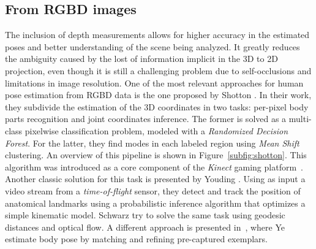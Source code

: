  \subsection{From RGBD images}\label{subsec:from_rgbd_images}
The inclusion of depth measurements allows for higher accuracy in the estimated poses and better understanding of the scene being analyzed. It greatly reduces the ambiguity caused by the lost of information implicit in the 3D to 2D projection, even though it is still a challenging problem due to self-occlusions and limitations in image resolution. One of the most relevant approaches for human pose estimation from RGBD data is the one proposed by Shotton \etal\cite{shotton2011real}. In their work, they subdivide the estimation of the 3D coordinates in two tasks: per-pixel body parts recognition and joint coordinates inference. The former is solved as a multi-class pixelwise classification problem, modeled with a \emph{Randomized Decision Forest}. For the latter, they find modes in each labeled region using \emph{Mean Shift} clustering. An overview of this pipeline is shown in Figure~\ref{subfig:shotton}. This algorithm was introduced as a core component of the \emph{Kinect} gaming platform~\cite{han2013enhanced}. Another classic solution for this task is presented by Youding \etal\cite{Youding_Zhu2008-pr}. Using as input a video stream from a \emph{time-of-flight} sensor, they detect and track the position of anatomical landmarks using a probabilistic inference algorithm that optimizes a simple kinematic model. Schwarz \etal\cite{Schwarz2011-qi} try to solve the same task using geodesic distances and optical flow. A different approach is presented in~\cite{Ye2011-ui}, where Ye \etal estimate body pose by matching and refining pre-captured exemplars.

